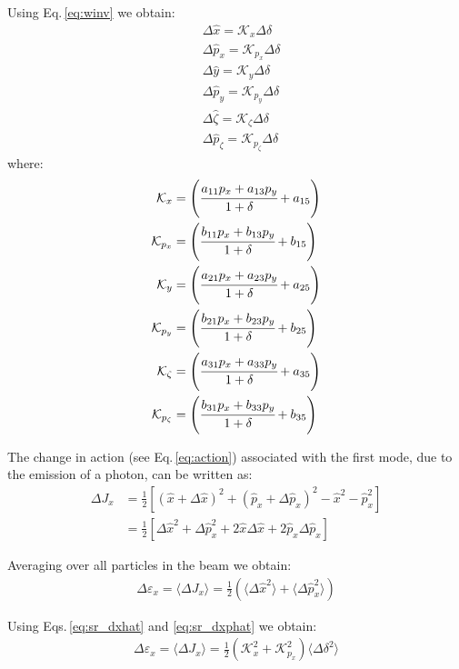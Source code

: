 Using Eq.\,\ref{eq:winv} we obtain:
\begin{align}
&\Delta \hat{x} = \mathcal{K}_x \Delta \delta \label{eq:sr_dxhat}\\
&\Delta \hat{p}_x = \mathcal{K}_{p_x} \Delta \delta \label{eq:sr_dxphat}\\
&\Delta \hat{y} = \mathcal{K}_{y} \Delta \delta \\
&\Delta \hat{p}_y = \mathcal{K}_{p_y} \Delta \delta\\
&\Delta \hat{\zeta} = \mathcal{K}_{\zeta} \Delta \delta \\
&\Delta \hat{p}_\zeta = \mathcal{K}_{p_{\zeta}}\Delta \delta
\end{align}
where:
\begin{align}
\mathcal{K}_x &=
\left( \cfrac{a_{11}p_{x} + a_{13}p_{y} }{1 + \delta} + a_{15}\right)\\
\mathcal{K}_{p_x} &=
\left( \cfrac{b_{11}p_{x} + b_{13}p_{y} }{1 + \delta} + b_{15}\right)\\
\mathcal{K}_y &=
\left( \cfrac{a_{21}p_{x} + a_{23}p_{y} }{1 + \delta} + a_{25}\right)\\
\mathcal{K}_{{p}_y} &=
\left( \cfrac{b_{21}p_{x} + b_{23}p_{y} }{1 + \delta} + b_{25}\right)\\
\mathcal{K}_{\zeta} &=
\left( \cfrac{a_{31}p_{x} + a_{33}p_{y} }{1 + \delta} + a_{35}\right)\\
\mathcal{K}_{p_\zeta} &=
\left( \cfrac{b_{31}p_{x} + b_{33}p_{y} }{1 + \delta} + b_{35}\right)
\end{align}

The change in action (see Eq.\,\ref{eq:action}) associated with the first mode, due to the emission of a photon, can be written as:
\begin{align}
\Delta J_x &= \frac{1}{2}\left[
 \left(\hat{x} +\Delta \hat{x}\right)^2
+ \left(\hat{p}_x +\Delta \hat{p}_x \right)^2
 -\hat{x}^2 - \hat{p}_x^2
 \right]\\
&= \frac{1}{2}\left[
\Delta \hat{x}^2 + \Delta \hat{p}_{x}^2
+ 2 \hat{x} \Delta \hat{x} + 2 \hat{p}_{x} \Delta \hat{p}_{x}
\right]
\end{align}

Averaging over all particles in the beam we obtain:
\begin{align}
\Delta \varepsilon_x = \langle\Delta J_x\rangle =
\frac{1}{2}\left( \langle\Delta \hat{x}^2\rangle + \langle\Delta \hat{p}_{x}^2\rangle \right)
\end{align}

Using Eqs.\,\ref{eq:sr_dxhat} and \ref{eq:sr_dxphat} we obtain:
\begin{align}
\Delta \varepsilon_x = \langle\Delta J_x\rangle =
\frac{1}{2}\left(\mathcal{K}^2_x + \mathcal{K}^2_{p_x}\right)\langle\Delta \delta^2\rangle
\end{align}

